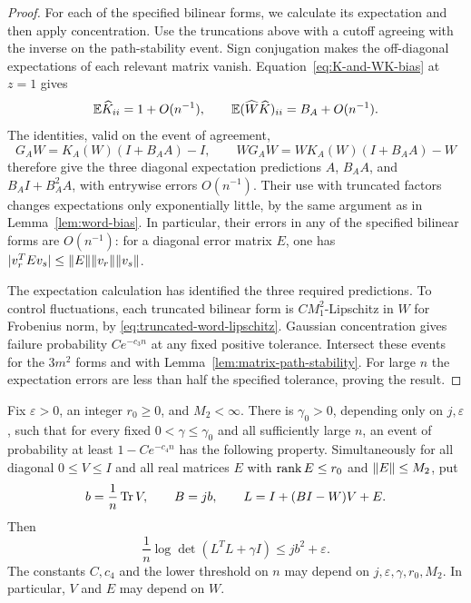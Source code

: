 \begin{proof}
For each of the specified bilinear forms, we calculate its
expectation and then apply concentration.  Use the truncations
above with a cutoff agreeing with the inverse on the path-stability
event.  Sign conjugation makes the off-diagonal expectations of
each relevant matrix vanish.
Equation~\eqref{eq:K-and-WK-bias} at $z=1$ gives
\[
 \mathbb E\widehat K_{ii}=1+O(n^{-1}),\qquad
 \mathbb E(\widehat W\widehat K)_{ii}=B_A+O(n^{-1}).
\]
The identities, valid on the event of agreement,
\[
 G_AW=K_A(W)(I+B_AA)-I,
 \qquad
 WG_AW=WK_A(W)(I+B_AA)-W
\]
therefore give the three diagonal expectation predictions
$A$, $B_AA$, and $B_AI+B_A^2A$, with entrywise errors
$O(n^{-1})$.  Their use with truncated factors changes
expectations only exponentially little, by the same argument
as in Lemma~\ref{lem:word-bias}.  In particular, their errors
in any of the specified bilinear forms are $O(n^{-1})$:
for a diagonal error matrix $E$, one has
$|v_r^TEv_s|\le\lVert E\rVert\lVert v_r\rVert\lVert v_s\rVert$.

The expectation calculation has identified the three required
predictions.  To control fluctuations, each truncated bilinear form
is $C M_1^2$-Lipschitz in $W$ for Frobenius norm, by
\eqref{eq:truncated-word-lipschitz}.  Gaussian
concentration gives failure probability $Ce^{-c_3n}$ at any
fixed positive tolerance.  Intersect these events for the
$3m^2$ forms and with Lemma~\ref{lem:matrix-path-stability}.
For large $n$ the expectation errors are less than half the
specified tolerance, proving the result.
\end{proof}

\begin{lemma}
\label{lem:logdet}
Fix $\varepsilon>0$, an integer $r_0\ge0$, and $M_2<\infty$.
There is $\gamma_0>0$, depending only on $j,\varepsilon$, such
that for every fixed $0<\gamma\le\gamma_0$ and all sufficiently
large $n$, an event of probability at least $1-Ce^{-c_4n}$ has
the following property.  Simultaneously for all diagonal
$0\le V\le I$ and all real matrices $E$ with
$\operatorname{rank} E\le r_0$ and $\lVert E\rVert\le M_2$, put
\[
 b=\frac1n\operatorname{Tr} V,\qquad B=jb,\qquad
 L=I+(BI-W)V+E.
\]
Then
\begin{equation}\label{eq:logdet-upper-bound}
 \frac1n\log\det(L^TL+\gamma I)\le jb^2+\varepsilon.
\end{equation}
The constants $C,c_4$ and the lower threshold on $n$ may depend
on $j,\varepsilon,\gamma,r_0,M_2$.  In particular, $V$ and $E$
may depend on $W$.
\end{lemma}

